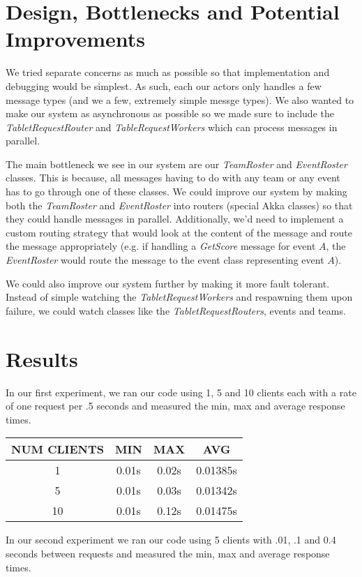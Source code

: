 \documentclass[11pt]{article}
\begin{document}
\section{Design, Bottlenecks and Potential Improvements}
We tried separate concerns as much as possible so that implementation
and debugging would be simplest.  As such, each our actors only
handles a few message types (and we a few, extremely simple
messge types).  We also wanted to make our system as
asynchronous as possible so we made sure to include the
\emph{TabletRequestRouter} and \emph{TableRequestWorkers} which can
process messages in parallel.

The main bottleneck we see in our system are our \emph{TeamRoster} and
\emph{EventRoster} classes.  This is because, all messages having to
do with any team or any event has to go through one of these classes.
We could improve our system by making both the \emph{TeamRoster} and
\emph{EventRoster} into routers (special Akka classes) so that they
could handle messages in parallel.  Additionally, we'd need to
implement a custom routing strategy that would look at the content of
the message and route the message appropriately (e.g. if handling a
\emph{GetScore} message for event $A$, the \emph{EventRoster} would
route the message to the event class representing event $A$).

We could also improve our system further by making it more fault
tolerant.  Instead of simple watching the \emph{TabletRequestWorkers}
and respawning them upon failure, we could watch classes like the
\emph{TabletRequestRouters}, events and teams.

\section{Results}
In our first experiment, we ran our code using 1, 5 and 10 clients
each with a rate of one request per .5 seconds and measured the min,
max and average response times.

\begin{tabular}{c|c|c|c}
  NUM CLIENTS & MIN & MAX & AVG \\
  \hline
  1  & 0.01s & 0.02s & 0.01385s \\
  5  & 0.01s & 0.03s & 0.01342s \\
  10 & 0.01s & 0.12s & 0.01475s \\
\end{tabular}

In our second experiment we ran our code using 5 clients with .01, .1
and 0.4 seconds between requests and measured the min, max and
average response times.
\end{document}

